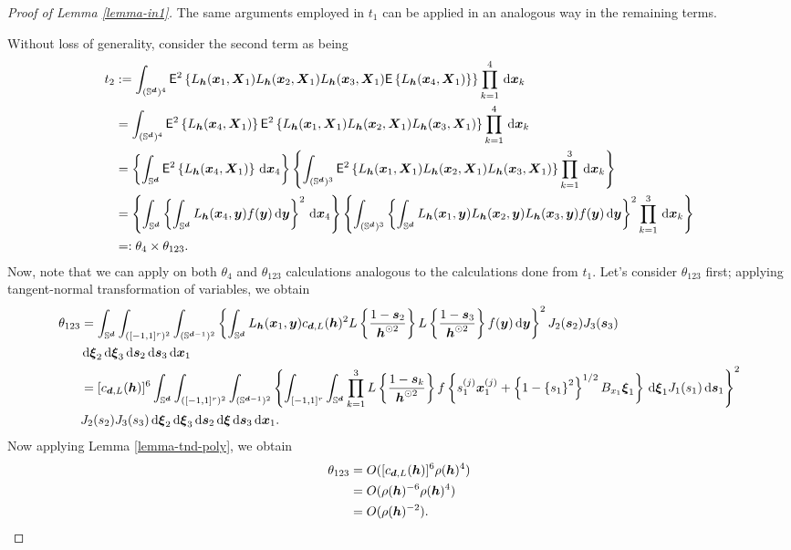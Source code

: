 \documentclass[oneside,11pt]{article}
\begin{document}
\begin{proof}[Proof of Lemma \ref{lemma-in1}]
The same arguments employed in $t_1$ can be applied in an analogous way in the remaining terms.

Without loss of generality, consider the second term as being
\begin{align*}
    t_2 &\defin \int_{(\Sr)^4} \mathsf{E}^2 \lrb{ L_{\bh} (\bx_1,\bX_1) L_{\bh} (\bx_2,\bX_1) L_{\bh} (\bx_3,\bX_1) \mathsf{E} \lrb{ L_{\bh} (\bx_4,\bX_1)} }\prod_{k=1}^{4} \,\rd \bx_k \\
    &= \int_{(\Sr)^4} \mathsf{E}^2 \lrb{ L_{\bh} (\bx_4,\bX_1)} \mathsf{E}^2 \lrb{ L_{\bh} (\bx_1,\bX_1) L_{\bh} (\bx_2,\bX_1) L_{\bh} (\bx_3,\bX_1) }\prod_{k=1}^{4} \,\rd \bx_k \\
    &= \lrb{ \int_{\Sr} \mathsf{E}^2 \lrb{ L_{\bh} (\bx_4,\bX_1)} \,\rd \bx_4} \lrb{ \int_{(\Sr)^3} \mathsf{E}^2 \lrb{ L_{\bh} (\bx_1,\bX_1) L_{\bh} (\bx_2,\bX_1) L_{\bh} (\bx_3,\bX_1) }\prod_{k=1}^{3} \,\rd \bx_k } \\
    &= \lrb{ \int_{\Sr} \lrb{ \int_{\Sr} L_{\bh} (\bx_4,\by) f(\by) \,\rd \by }^2 \,\rd \bx_4} \lrb{ \int_{(\Sr)^3} \lrb{ \int_{\Sr} L_{\bh} (\bx_1,\by) L_{\bh} (\bx_2,\by) L_{\bh} (\bx_3,\by) f(\by) \,\rd \by}^2 \prod_{k=1}^{3} \,\rd \bx_k } \\
    & \indef \theta_{4} \times \theta_{123}.
\end{align*}
Now, note that we can apply on both $\theta_{4}$ and $\theta_{123}$ calculations analogous to the calculations done from $t_1$. Let's consider $\theta_{123}$ first; applying tangent-normal transformation of variables, we obtain
\begin{align*}
    \theta_{123} &= \int_{\Sr} \int_{([-1,1]^r)^2} \int_{(\Srm)^2} \lrb{ \int_{\Sr}L_{\bh} (\bx_1,\by) c_{\bd,L}(\bh)^2 L \lrb{ \frac{1 - \bs_2}{\bh^{\odot 2 }} } L \lrb{ \frac{1 - \bs_3}{\bh^{\odot 2 }} } f(\by) \,\rd \by }^2 J_2(\bs_2) J_3(\bs_3) \\
    & \,\rd \bxi_2 \,\rd \bxi_3 \,\rd \bs_2 \,\rd \bs_3 \,\rd \bx_1 \\
    &= [c_{\bd,L}(\bh)]^6 \int_{\Sr} \int_{([-1,1]^r)^2} \int_{(\Srm)^2} \lrb{ \int_{[-1,1]^r} \int_{\Sr} \prod_{k=1}^{3} L \lrb{ \frac{1 - \bs_k}{\bh^{\odot 2 }} } f \lrb{ s_1^{(j)} \bx_1^{(j)} + \lrb{1 - \lrb{s_1}^2}^{1/2} B_{x_1} \bxi_1 } \,\rd \bxi_1 J_1(s_1) \,\rd \bs_1 }^2 \\
    & J_2(s_2) J_3(s_3) \,\rd \bxi_2 \,\rd \bxi_3 \,\rd \bs_2 \,\rd \bxi \,\rd \bs_3 \,\rd \bx_1.
\end{align*}
Now applying Lemma \ref{lemma-tnd-poly}, we obtain
\begin{align*}
    \theta_{123} &= O([c_{\bd,L}(\bh)]^6 \rho (\bh)^4) \\
    &= O(\rho (\bh)^{-6} \rho (\bh)^4) \\
    &= O(\rho (\bh)^{-2}).
\end{align*}


\end{proof}
\end{document}

